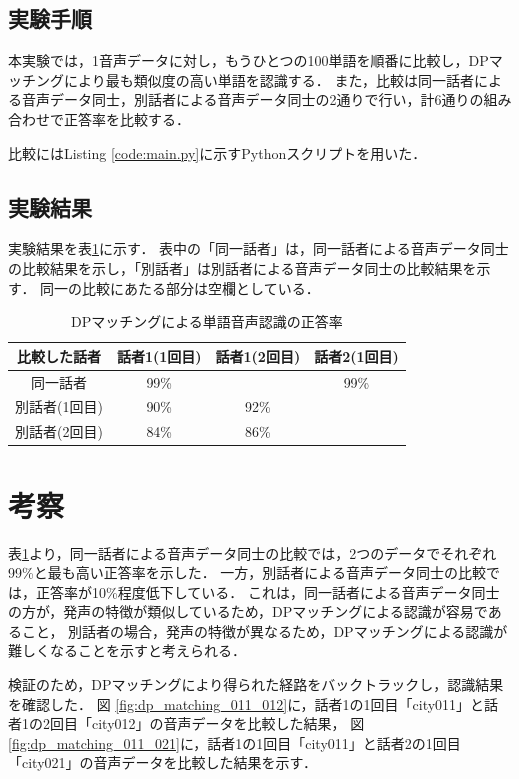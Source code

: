 \documentclass[dvipdfmx,titlepage,a4j]{jsarticle}
\begin{document}
\subsection{実験手順}
本実験では，1音声データに対し，もうひとつの100単語を順番に比較し，DPマッチングにより最も類似度の高い単語を認識する．
また，比較は同一話者による音声データ同士，別話者による音声データ同士の2通りで行い，計6通りの組み合わせで正答率を比較する．

比較にはListing \ref{code:main.py}に示すPythonスクリプトを用いた．

\subsection{実験結果}
実験結果を表\ref{table:result}に示す．
表中の「同一話者」は，同一話者による音声データ同士の比較結果を示し，「別話者」は別話者による音声データ同士の比較結果を示す．
同一の比較にあたる部分は空欄としている．

\begin{table}[H]
    \begin{center}
        \caption{DPマッチングによる単語音声認識の正答率}
        \begin{tabular}{c|c|c|c} \hline
            比較した話者   & 話者1(1回目) & 話者1(2回目) & 話者2(1回目) \\ \hline
            同一話者     & 99\%     &          & 99\%     \\
            別話者(1回目) & 90\%     & 92\%                \\
            別話者(2回目) & 84\%     & 86\%                \\ \hline
        \end{tabular}
        \label{table:result}
    \end{center}
\end{table}

\section{考察}
表\ref{table:result}より，同一話者による音声データ同士の比較では，2つのデータでそれぞれ99\%と最も高い正答率を示した．
一方，別話者による音声データ同士の比較では，正答率が10\%程度低下している．
これは，同一話者による音声データ同士の方が，発声の特徴が類似しているため，DPマッチングによる認識が容易であること，
別話者の場合，発声の特徴が異なるため，DPマッチングによる認識が難しくなることを示すと考えられる．

検証のため，DPマッチングにより得られた経路をバックトラックし，認識結果を確認した．
図 \ref{fig:dp_matching_011_012}に，話者1の1回目「city011」と話者1の2回目「city012」の音声データを比較した結果，
図 \ref{fig:dp_matching_011_021}に，話者1の1回目「city011」と話者2の1回目「city021」の音声データを比較した結果を示す．
\end{document}
